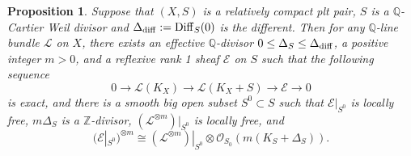 \documentclass[12pt]{amsart}
\theoremstyle{plain}
\newtheorem{proposition}[theorem]{Proposition}
\theoremstyle{remark}
\theoremstyle{definition}
\newcommand{\<}{\leq}
\newcommand{\Q}{{\mathbb{Q}}}
\newcommand{\mbZ}{\mathbb{Z}}
\theoremstyle{definition}
\theoremstyle{definition}
\numberwithin{equation}{section}
\theoremstyle{remark}
\begin{document}
\begin{proposition}\label{p-hw} 
    Suppose that $(X,S)$ is a relatively compact plt pair, $S$ is a $\Q$-Cartier Weil divisor and $\Delta _{\rm diff}:={\rm Diff}_S(0)$ is the different.
    Then for any $\Q$-line bundle $\mathcal L$ %
    on $X$, there exists an effective $\Q$-divisor $0\<\Delta _S \leq \Delta _{\rm diff}$, a positive integer $m>0$,  
and a  reflexive rank 1 sheaf $\mathcal E$ on $S$  such that the following sequence
\begin{equation}\label{eqn:reflexive-exact}
0\to \mathcal L(K_X)\to \mathcal L(K_X+S)\to \mathcal E \to 0
\end{equation}
is exact, and there is a smooth big open subset $S^0\subset S$ such that $\mathcal E|_{S^0}$ is locally free, $m\Delta _S$ is a $\mbZ$-divisor, %
$(\mathcal L^{\otimes m})|_{S^0}$ is locally free,  and \[(\mathcal E|_{S^0}) ^{\otimes m}\cong (\mathcal L^{\otimes m})|_{S^0}\otimes \mathcal O _{S_0}(m(K_S+\Delta _S)).\] 
\end{proposition}
\end{document}
